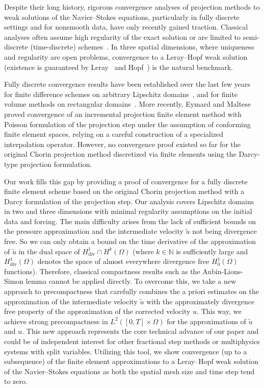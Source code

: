 \documentclass[10pt,letterpaper]{amsart}
\newcommand{\N}{\mathbb{N}}
\newcommand{\tu}{\widetilde{u}}
\newcommand{\Div}{\operatorname{div}}
\newcommand{\dom}{\Omega}
\theoremstyle{definition}{\newtheorem{definition}[lemma]{Definition}}
\numberwithin{equation}{section}
\begin{document}
	Despite their long history, rigorous convergence analyses of projection methods to weak solutions of the Navier–Stokes equations, particularly in fully discrete settings and for nonsmooth data, have only recently gained traction. Classical analyses often assume high regularity of the exact solution or are limited to semi-discrete (time-discrete) schemes~\cite{Guermond1996,Guermond1998,Hou1992,Hou1993,Achdou2000,E2002,Shen1996,Temam1968,Temam1977,Guermond2006}. In three spatial dimensions, where uniqueness and regularity are open problems, convergence to a Leray–Hopf weak solution (existence is guaranteed by Leray~\cite{Leray1934} and Hopf~\cite{Hopf1951}) is the natural benchmark.
	
	Fully discrete convergence results have been established over the last few years for finite difference schemes on arbitrary Lipschitz domains~\cite{Kuroki2020,Maeda2022}, and for finite volume methods on rectangular domains~\cite{Gallouet2023}. More recently, Eymard and Maltese~\cite{Eymard2024} proved convergence of an incremental projection finite element method with Poisson formulation of the projection step under the assumption of conforming finite element spaces, relying on a careful construction of a specialized interpolation operator. However, no convergence proof existed so far for the original Chorin projection method discretized via finite elements using the Darcy-type projection formulation. 
	
	Our work fills this gap by providing a proof of convergence for a fully discrete finite element scheme based on the original Chorin projection method with a Darcy formulation of the projection step. Our analysis covers Lipschitz domains in two and three dimensions with minimal regularity assumptions on the initial data and forcing. 
	The main difficulty arises from the lack of sufficient bounds on the pressure approximation and the intermediate velocity $\tu$ not being divergence free. So we can only obtain a bound on the time derivative of the approximation of $\tu$ in the dual space of $H^1_{\Div}\cap H^k(\dom)$ (where $k\in \N$ is sufficiently large and $H^1_{\Div}(\dom)$ denotes the space of almost everywhere divergence free $H^1_0(\dom)$ functions). Therefore, classical compactness results such as the Aubin-Lions-Simon lemma cannot be applied directly. To overcome this, we take a new approach to precompactness that carefully combines the a priori estimates on the approximation of the intermediate velocity $\tu$ with the approximately divergence free property of the approximation of the corrected velocity $u$. This way, we achieve strong precompactness in $L^2([0,T]\times\dom)$ for the approximations of $\tu$ and $u$.
	This new approach represents the core technical advance of our paper and could be of independent interest for other fractional step methods or multiphysics systems with split variables. Utilizing this tool, we show convergence (up to a subsequence) of the finite element approximations to a Leray–Hopf weak solution of the Navier–Stokes equations as both the spatial mesh size and time step tend to zero.
	
\end{document}
